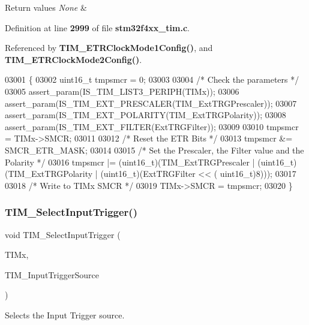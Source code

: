 \begin{DoxyRetVals}{Return values}
{\em None} & \\
\hline
\end{DoxyRetVals}


Definition at line \textbf{ 2999} of file \textbf{ stm32f4xx\+\_\+tim.\+c}.



Referenced by \textbf{ T\+I\+M\+\_\+\+E\+T\+R\+Clock\+Mode1\+Config()}, and \textbf{ T\+I\+M\+\_\+\+E\+T\+R\+Clock\+Mode2\+Config()}.


\begin{DoxyCode}
03001 \{
03002   uint16\_t tmpsmcr = 0;
03003 
03004   \textcolor{comment}{/* Check the parameters */}
03005   assert_param(IS_TIM_LIST3_PERIPH(TIMx));
03006   assert_param(IS_TIM_EXT_PRESCALER(TIM\_ExtTRGPrescaler));
03007   assert_param(IS_TIM_EXT_POLARITY(TIM\_ExtTRGPolarity));
03008   assert_param(IS_TIM_EXT_FILTER(ExtTRGFilter));
03009 
03010   tmpsmcr = TIMx->SMCR;
03011 
03012   \textcolor{comment}{/* Reset the ETR Bits */}
03013   tmpsmcr &= SMCR_ETR_MASK;
03014 
03015   \textcolor{comment}{/* Set the Prescaler, the Filter value and the Polarity */}
03016   tmpsmcr |= (uint16\_t)(TIM\_ExtTRGPrescaler | (uint16\_t)(TIM\_ExtTRGPolarity | (uint16\_t)(ExtTRGFilter << (
      uint16\_t)8)));
03017 
03018   \textcolor{comment}{/* Write to TIMx SMCR */}
03019   TIMx->SMCR = tmpsmcr;
03020 \}
\end{DoxyCode}
\mbox{\label{group__TIM__Group7_ga4252583c6ae8a73d6fc66f7e951dbc35}} 
\subsubsection{T\+I\+M\+\_\+\+Select\+Input\+Trigger()}
{\footnotesize\ttfamily void T\+I\+M\+\_\+\+Select\+Input\+Trigger (\begin{DoxyParamCaption}\item[{\textbf{ T\+I\+M\+\_\+\+Type\+Def} $\ast$}]{T\+I\+Mx,  }\item[{uint16\+\_\+t}]{T\+I\+M\+\_\+\+Input\+Trigger\+Source }\end{DoxyParamCaption})}



Selects the Input Trigger source. 


